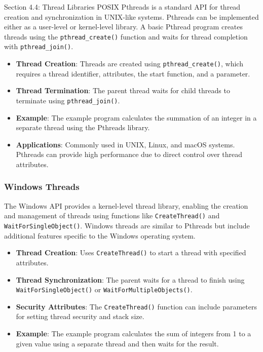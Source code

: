 \begin{notes}{Section 4.4: Thread Libraries}
    POSIX Pthreads is a standard API for thread creation and synchronization in UNIX-like systems. Pthreads can be implemented either as a user-level or kernel-level library. A basic Pthread program 
    creates threads using the \texttt{pthread\_create()} function and waits for thread completion with \texttt{pthread\_join()}.
    
    \begin{highlight}
    
        \begin{itemize}
            \item \textbf{Thread Creation}: Threads are created using \texttt{pthread\_create()}, which requires a thread identifier, attributes, the start function, and a parameter.
            \item \textbf{Thread Termination}: The parent thread waits for child threads to terminate using \texttt{pthread\_join()}.
            \item \textbf{Example}: The example program calculates the summation of an integer in a separate thread using the Pthreads library.
            \item \textbf{Applications}: Commonly used in UNIX, Linux, and macOS systems. Pthreads can provide high performance due to direct control over thread attributes.
        \end{itemize}
    
    \end{highlight}
    
    \subsubsection*{Windows Threads}
    
    The Windows API provides a kernel-level thread library, enabling the creation and management of threads using functions like \texttt{CreateThread()} and \texttt{WaitForSingleObject()}. Windows threads 
    are similar to Pthreads but include additional features specific to the Windows operating system.
    
    \begin{highlight}
    
        \begin{itemize}
            \item \textbf{Thread Creation}: Uses \texttt{CreateThread()} to start a thread with specified attributes.
            \item \textbf{Thread Synchronization}: The parent waits for a thread to finish using \texttt{WaitForSingleObject()} or \texttt{WaitForMultipleObjects()}.
            \item \textbf{Security Attributes}: The \texttt{CreateThread()} function can include parameters for setting thread security and stack size.
            \item \textbf{Example}: The example program calculates the sum of integers from 1 to a given value using a separate thread and then waits for the result.
        \end{itemize}
    

\end{highlight}
\end{notes}
